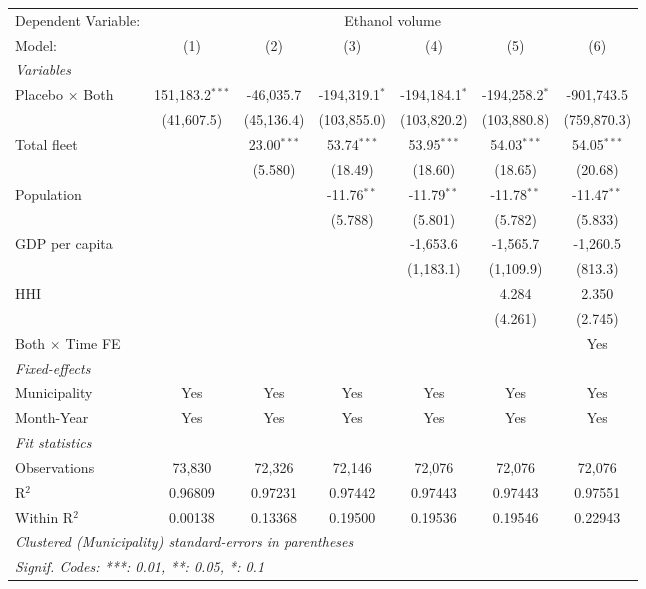 \documentclass[
]{article}
\begin{document}
\begin{tabular}{lcccccc}
\tabularnewline\midrule\midrule
Dependent Variable:&\multicolumn{6}{c}{Ethanol volume}\\
Model:&(1) & (2) & (3) & (4) & (5) & (6)\\
\midrule \emph{Variables}&   &   &   &   &   &  \\
Placebo $\times $ Both & 151,183.2$^{***}$ & -46,035.7 & -194,319.1$^{*}$ & -194,184.1$^{*}$ & -194,258.2$^{*}$ & -901,743.5\\
  &(41,607.5) & (45,136.4) & (103,855.0) & (103,820.2) & (103,880.8) & (759,870.3)\\
Total fleet &    & 23.00$^{***}$ & 53.74$^{***}$ & 53.95$^{***}$ & 54.03$^{***}$ & 54.05$^{***}$\\
  &   & (5.580) & (18.49) & (18.60) & (18.65) & (20.68)\\
Population &    &    & -11.76$^{**}$ & -11.79$^{**}$ & -11.78$^{**}$ & -11.47$^{**}$\\
  &   &    & (5.788) & (5.801) & (5.782) & (5.833)\\
GDP per capita &    &    &    & -1,653.6 & -1,565.7 & -1,260.5\\
  &   &    &    & (1,183.1) & (1,109.9) & (813.3)\\
HHI &    &    &    &    & 4.284 & 2.350\\
  &   &    &    &    & (4.261) & (2.745)\\
Both $\times$ Time FE &  &  &  &  &  & Yes\\
\midrule \emph{Fixed-effects}&   &   &   &   &   &  \\
Municipality & Yes & Yes & Yes & Yes & Yes & Yes\\
Month-Year & Yes & Yes & Yes & Yes & Yes & Yes\\
\midrule \emph{Fit statistics}&  & & & & & \\
Observations & 73,830&72,326&72,146&72,076&72,076&72,076\\
R$^2$ & 0.96809&0.97231&0.97442&0.97443&0.97443&0.97551\\
Within R$^2$ & 0.00138&0.13368&0.19500&0.19536&0.19546&0.22943\\
\midrule\midrule\multicolumn{7}{l}{\emph{Clustered (Municipality) standard-errors in parentheses}}\\
\multicolumn{7}{l}{\emph{Signif. Codes: ***: 0.01, **: 0.05, *: 0.1}}\\
\end{tabular}
\end{document}
